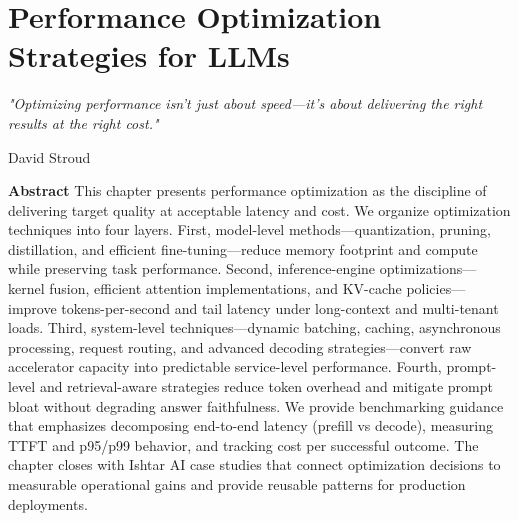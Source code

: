 \chapter{Performance Optimization Strategies for LLMs}
\label{ch:performance}
\newrefsegment


\epigraph{\emph{"Optimizing performance isn't just about speed—it's about delivering the right results at the right cost."}}{David Stroud}

\textbf{Abstract} This chapter presents performance optimization as the discipline of delivering target quality at acceptable latency and cost. We organize optimization techniques into four layers. First, model-level methods—quantization, pruning, distillation, and efficient fine-tuning—reduce memory footprint and compute while preserving task performance. Second, inference-engine optimizations—kernel fusion, efficient attention implementations, and KV-cache policies—improve tokens-per-second and tail latency under long-context and multi-tenant loads. Third, system-level techniques—dynamic batching, caching, asynchronous processing, request routing, and advanced decoding strategies—convert raw accelerator capacity into predictable service-level performance. Fourth, prompt-level and retrieval-aware strategies reduce token overhead and mitigate prompt bloat without degrading answer faithfulness. We provide benchmarking guidance that emphasizes decomposing end-to-end latency (prefill vs decode), measuring TTFT and p95/p99 behavior, and tracking cost per successful outcome. The chapter closes with Ishtar AI case studies that connect optimization decisions to measurable operational gains and provide reusable patterns for production deployments.

